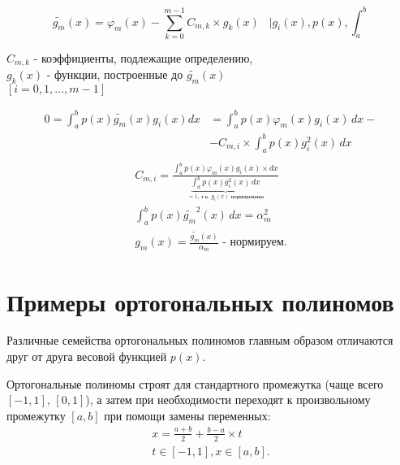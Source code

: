 \documentclass[a4paper,11pt]{article}
\begin{document}
\begin{importantblock}
  \begin{equation*}
    \widetilde{g_m}(x) = \varphi_m(x) - \sum_{k=0}^{m-1}C_{m,k} \times g_k(x) \hspace{10pt} \bigg| g_i(x), p(x), \int_a^b
  \end{equation*}
  \begin{flushright}
    \footnotesize
    $C_{m,k}$ - коэффициенты, подлежащие определению, \\
    $g_k(x)$ - функции, построенные до $\widetilde{g_m}(x)$ \\
    $[i=0,1,\dots,m-1]$
  \end{flushright}
  \begin{align*}
    0 =  \int_a^b p(x)\widetilde{g_m}(x)g_i(x)dx &= \int_a^b p(x)\varphi_m(x)g_i(x)\, dx -\\
    &- C_{m,i} \times \int_a^b p(x)g_i^2(x)\, dx \\
  \end{align*}
  \begin{gather*}
    C_{m,i} = \frac{\int_a^b p(x)\varphi_m(x)g_i(x) \times dx}{\underbrace{\int_a^b p(x)g_i^2(x)\, dx}_{=1\text{, т.к. $g_i(x)$ нормированы}}} \\
    \int_a^b p(x)\widetilde{g_m}^2(x)\, dx = \alpha_m^2 \\
    g_m(x) = \frac{\widetilde{g_m}(x)}{\alpha_m} \textit{ - нормируем}.
  \end{gather*}
\end{importantblock}

\section{Примеры ортогональных полиномов}
Различные семейства ортогональных полиномов главным образом отличаются друг от друга весовой функцией $p(x)$.
\begin{mainblock}
  Ортогональные полиномы строят для стандартного промежутка (чаще всего $[-1, 1],\, [0, 1]$), а затем при необходимости
  переходят к произвольному промежутку $[a,b]$ при помощи замены переменных:
  \begin{gather*}
    \boxed{x = \frac{a+b}{2}+\frac{b-a}{2} \times t} \\
    t \in [-1,1], x \in [a,b].
  \end{gather*}
\end{mainblock}
\end{document}
